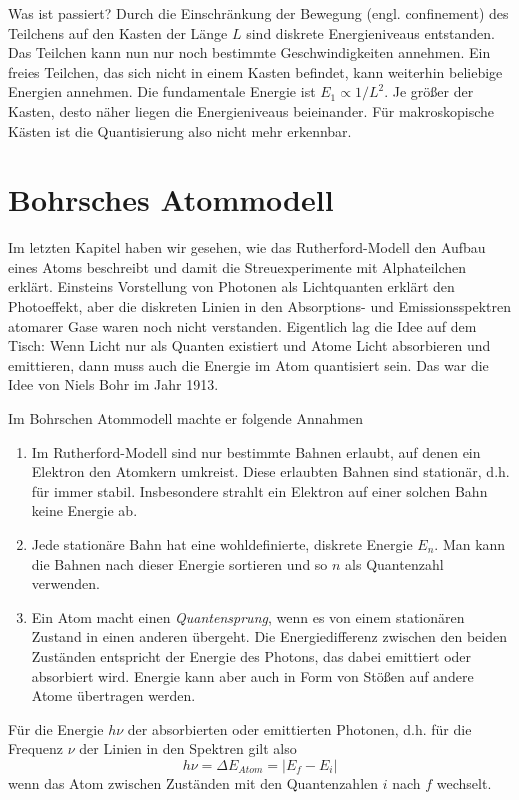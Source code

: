Was ist passiert? Durch die Einschränkung der Bewegung (engl. confinement) des Teilchens auf den Kasten der Länge $L$ sind diskrete Energieniveaus entstanden. Das Teilchen kann nun nur noch bestimmte Geschwindigkeiten annehmen. Ein freies Teilchen, das sich nicht in einem Kasten befindet, kann weiterhin beliebige Energien annehmen. Die fundamentale Energie ist $E_1 \propto 1/L^2$. Je größer der Kasten, desto näher liegen die Energieniveaus beieinander. Für makroskopische Kästen ist die Quantisierung also nicht mehr erkennbar.



\section{Bohrsches Atommodell}

Im letzten Kapitel haben wir gesehen, wie das Rutherford-Modell den Aufbau eines Atoms beschreibt und damit die Streuexperimente mit Alphateilchen erklärt. Einsteins Vorstellung von Photonen als Lichtquanten erklärt den Photoeffekt, aber die diskreten Linien in den Absorptions- und Emissionsspektren atomarer Gase waren noch nicht verstanden. Eigentlich lag die Idee auf dem Tisch: Wenn Licht nur als Quanten existiert und Atome Licht absorbieren und emittieren, dann muss auch die Energie im Atom quantisiert sein. Das war die Idee von Niels Bohr im Jahr 1913.

Im Bohrschen Atommodell machte er folgende Annahmen
\begin{enumerate} \setlength{\itemsep}{0pt}
    \item Im Rutherford-Modell sind nur bestimmte Bahnen erlaubt, auf denen ein Elektron den Atomkern umkreist. Diese erlaubten Bahnen sind stationär, d.h. für immer stabil. Insbesondere strahlt ein Elektron auf einer solchen Bahn keine Energie ab.
    \item Jede stationäre Bahn hat eine wohldefinierte, diskrete Energie $E_n$. Man kann die Bahnen nach dieser Energie sortieren und so $n$ als Quantenzahl verwenden.
    \item Ein Atom macht einen \emph{Quantensprung}, wenn es von einem stationären Zustand in einen anderen übergeht. Die Energiedifferenz zwischen den beiden Zuständen entspricht der Energie des Photons, das dabei emittiert oder absorbiert wird. Energie kann aber auch in Form von Stößen auf andere Atome übertragen werden.
\end{enumerate}
Für die Energie $h\nu$ der absorbierten oder emittierten Photonen, d.h. für die Frequenz $\nu$ der Linien in den Spektren gilt also
\begin{equation}
    h \nu = \Delta E_{Atom} = | E_f - E_i |
\end{equation}
wenn das Atom zwischen Zuständen mit den Quantenzahlen $i$ nach $f$ wechselt.


